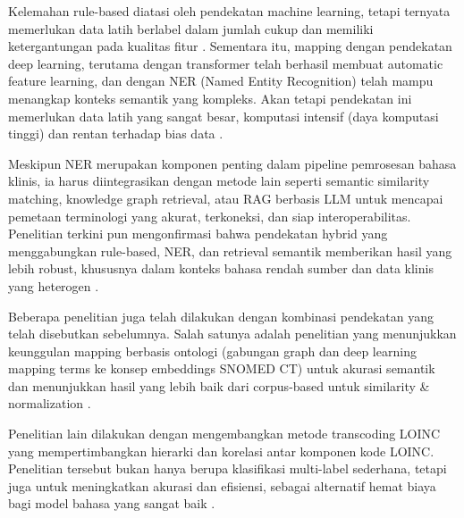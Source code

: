 Kelemahan rule-based diatasi oleh pendekatan machine learning, tetapi ternyata memerlukan data latih berlabel dalam jumlah cukup dan memiliki ketergantungan pada kualitas fitur \citep{agrawal_evaluating_2018,januel_improved_2011}. Sementara itu, mapping dengan pendekatan deep learning, terutama dengan transformer telah berhasil membuat automatic feature learning, dan dengan NER (Named Entity Recognition) telah mampu menangkap konteks semantik yang kompleks. Akan tetapi pendekatan ini memerlukan data latih yang sangat besar, komputasi intensif (daya komputasi tinggi) dan rentan terhadap bias data \citep{hristov_application_2021,soriano_snomed2vec_2019,zhou_novel_2024}.

Meskipun NER merupakan komponen penting dalam pipeline pemrosesan bahasa klinis, ia harus diintegrasikan dengan metode lain seperti semantic similarity matching, knowledge graph retrieval, atau RAG berbasis LLM untuk mencapai pemetaan terminologi yang akurat, terkoneksi, dan siap interoperabilitas. Penelitian terkini pun mengonfirmasi bahwa pendekatan hybrid yang menggabungkan rule-based, NER, dan retrieval semantik memberikan hasil yang lebih robust, khususnya dalam konteks bahasa rendah sumber dan data klinis yang heterogen \citep{chen_clinical_2020,gilani_cde-mapper_2025,pezoulas_hybrid_2021}.

Beberapa penelitian juga telah dilakukan dengan kombinasi pendekatan yang telah disebutkan sebelumnya. Salah satunya adalah penelitian yang menunjukkan keunggulan mapping berbasis ontologi (gabungan graph dan deep learning mapping terms ke konsep embeddings SNOMED CT) untuk akurasi semantik dan menunjukkan hasil yang lebih baik dari corpus-based untuk similarity \& normalization \citep{zahra_obtaining_2024}.

Penelitian lain dilakukan dengan mengembangkan metode transcoding LOINC yang mempertimbangkan hierarki dan korelasi antar komponen kode LOINC. Penelitian tersebut bukan hanya berupa klasifikasi multi-label sederhana, tetapi juga untuk meningkatkan akurasi dan efisiensi, sebagai alternatif hemat biaya bagi model bahasa yang sangat baik \citep{michel-picque_classifier_2024}.

